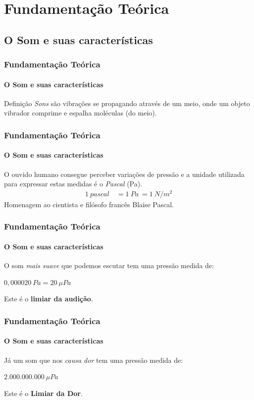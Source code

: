 \documentclass[brazil]{beamer}
\begin{document}

	\section{Fundamentação Teórica}

	\subsection{O Som e suas características}

	\begin{frame}
		\frametitle{Fundamentação Teórica}
		\framesubtitle{O Som e suas características}
		\begin{block}{Definição}
			\textit{Sons} são vibrações se propagando através de um meio, onde um objeto vibrador comprime e espalha moléculas (do meio).
		\end{block}
	\end{frame}

	\begin{frame}
		\frametitle{Fundamentação Teórica}
		\framesubtitle{O Som e suas características}
		O ouvido humano consegue perceber variações de pressão e a unidade utilizada para expressar estas medidas é o \textit{Pascal} (Pa). 
		\begin{align}
		   1 \ pascal \ & = 1 \ Pa \ = 1 \ N/m^2
		\end{align}
		\vspace{0.5cm}Homenagem ao cientista e filósofo francês Blaise Pascal.
	\end{frame}	

	\begin{frame}
		\frametitle{Fundamentação Teórica}
		\framesubtitle{O Som e suas características}
		O som \textit{mais suave} que podemos escutar tem uma pressão medida de:
		\begin{center}
			$0,000020 \ Pa = 20 \ \mu Pa$
		\end{center}
		Este é o \textbf{limiar da audição}.
	\end{frame}	

	\begin{frame}
		\frametitle{Fundamentação Teórica}
		\framesubtitle{O Som e suas características}
		Já um som que nos \textit{causa dor} tem uma pressão medida de:
		\begin{center}
			$2.000.000.000 \ \mu Pa$
		\end{center}
		Este é o \textbf{Limiar da Dor}.
	\end{frame}	
\end{document}
